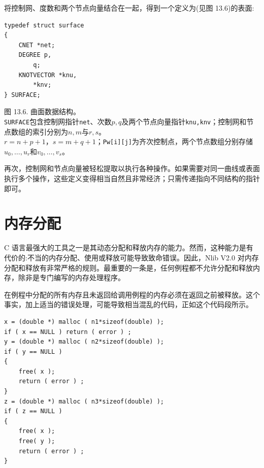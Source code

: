 \documentclass[../main.tex]{subfiles}
\begin{document}
将控制网、度数和两个节点向量结合在一起，得到一个定义为(见图 13.6)的表面:

\begin{verbatim}
typedef struct surface
{
    CNET *net;
    DEGREE p,
        q;
    KNOTVECTOR *knu,
        *knv;
} SURFACE;
\end{verbatim}



\begin{center}
\begin{minipage}{37cm}
\centering
{}
\par\smallskip
图 13.6. 曲面数据结构。\\
\texttt{SURFACE}包含控制网指针\texttt{net}、次数$p,q$及两个节点向量指针\texttt{knu,knv}；控制网和节点数组的索引分别为$n,m$与$r,s$。\\
$r=n+p+1$，$s=m+q+1$；\texttt{Pw[i][j]}为齐次控制点，两个节点数组分别存储$u_0,\ldots,u_r$和$v_0,\ldots,v_s$。
\end{minipage}
\end{center}

再次，控制网和节点向量被轻松提取以执行各种操作。如果需要对同一曲线或表面执行多个操作，这些定义变得相当自然且非常经济；只需传递指向不同结构的指针即可。


\section{内存分配}

\(\mathrm{C}\) 语言最强大的工具之一是其动态分配和释放内存的能力。然而，这种能力是有代价的:不当的内存分配、使用或释放可能导致致命错误。因此，Nlib V2.0 对内存分配和释放有非常严格的规则。最重要的一条是，任何例程都不允许分配和释放内存，除非是专门编写的内存处理程序。



在例程中分配的所有内存且未返回给调用例程的内存必须在返回之前被释放。这个事实，加上适当的错误处理，可能导致相当混乱的代码，正如这个代码段所示。

\begin{verbatim}
x = (double *) malloc ( n1*sizeof(double) );
if ( x == NULL ) return ( error ) ;
y = (double *) malloc ( n2*sizeof(double) );
if ( y == NULL )
{
    free( x );
    return ( error ) ;
}
z = (double *) malloc ( n3*sizeof(double) );
if ( z == NULL )
{
    free( x );
    free( y );
    return ( error ) ;
}
\end{verbatim}
\end{document}
